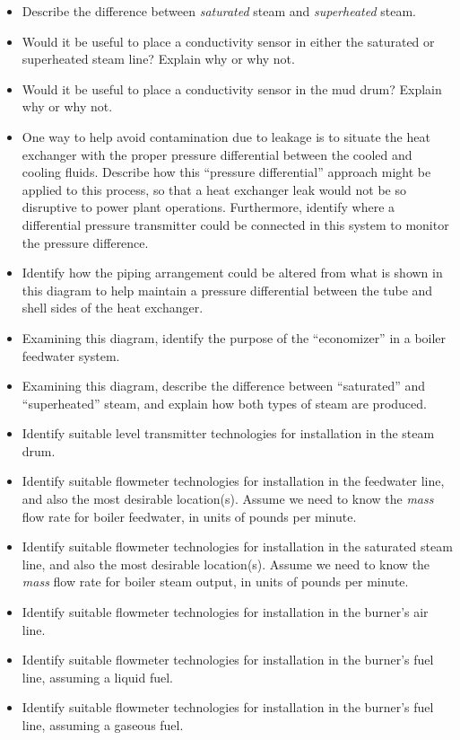 \begin{itemize}
\item{} Describe the difference between {\it saturated} steam and {\it superheated} steam. 
\item{} Would it be useful to place a conductivity sensor in either the saturated or superheated steam line?  Explain why or why not.
\item{} Would it be useful to place a conductivity sensor in the mud drum?  Explain why or why not.
\item{} One way to help avoid contamination due to leakage is to situate the heat exchanger with the proper pressure differential between the cooled and cooling fluids.  Describe how this ``pressure differential'' approach might be applied to this process, so that a heat exchanger leak would not be so disruptive to power plant operations.  Furthermore, identify where a differential pressure transmitter could be connected in this system to monitor the pressure difference.
\item{} Identify how the piping arrangement could be altered from what is shown in this diagram to help maintain a pressure differential between the tube and shell sides of the heat exchanger.
\item{} Examining this diagram, identify the purpose of the ``economizer'' in a boiler feedwater system.
\item{} Examining this diagram, describe the difference between ``saturated'' and ``superheated'' steam, and explain how both types of steam are produced.
\item{} Identify suitable level transmitter technologies for installation in the steam drum.
\item{} Identify suitable flowmeter technologies for installation in the feedwater line, and also the most desirable location(s).  Assume we need to know the {\it mass} flow rate for boiler feedwater, in units of pounds per minute.
\item{} Identify suitable flowmeter technologies for installation in the saturated steam line, and also the most desirable location(s).  Assume we need to know the {\it mass} flow rate for boiler steam output, in units of pounds per minute.
\item{} Identify suitable flowmeter technologies for installation in the burner's air line.
\item{} Identify suitable flowmeter technologies for installation in the burner's fuel line, assuming a liquid fuel.
\item{} Identify suitable flowmeter technologies for installation in the burner's fuel line, assuming a gaseous fuel.
\end{itemize}

